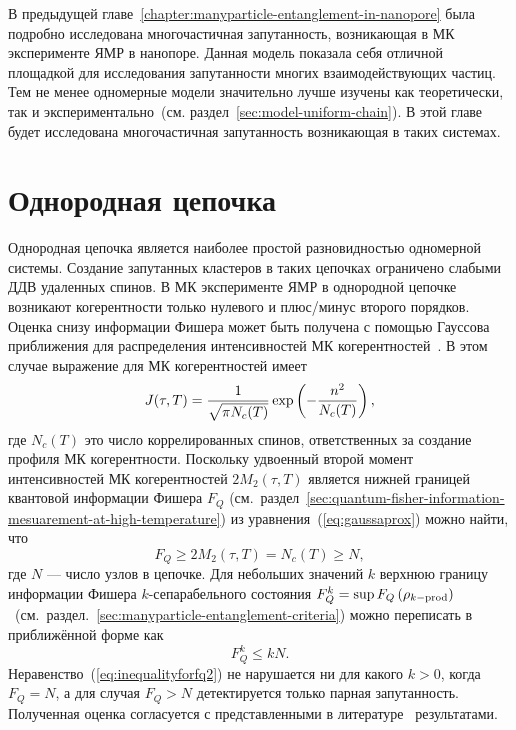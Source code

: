 В предыдущей главе~\ref{chapter:manyparticle-entanglement-in-nanopore}
была подробно исследована многочастичная запутанность,
возникающая в МК эксперименте ЯМР в нанопоре.
Данная модель показала себя отличной площадкой
для исследования запутанности многих взаимодействующих частиц.
Тем не менее одномерные модели значительно лучше изучены как теоретически,
так и экспериментально~(см. раздел~\ref{sec:model-uniform-chain}).
В этой главе будет исследована многочастичная запутанность возникающая в таких системах.


\section{Однородная цепочка}
Однородная цепочка является наиболее простой разновидностью одномерной системы.
Создание запутанных кластеров в таких цепочках ограничено слабыми ДДВ удаленных спинов.
В МК эксперименте ЯМР в однородной цепочке возникают когерентности только нулевого и плюс/минус второго порядков.
Оценка снизу информации Фишера может быть получена с помощью Гауссова приближения для распределения интенсивностей МК когерентностей~\cite{Baum1985}.
В этом случае выражение для МК когерентностей имеет
%
\begin{equation}\label{eq:gaussaprox}
  J(\tau, T)=\dfrac{1}{\sqrt{\pi N_c(T)}} \exp\left( -\frac{n^2}{N_c(T)} \right),
\end{equation}
%
где $N_c(T)$ это число коррелированных спинов,
ответственных за создание профиля МК когерентности.
Поскольку удвоенный второй момент интенсивностей МК когерентностей $2M_2(\tau, T)$ является нижней границей квантовой информации Фишера $F_Q$
(см.~раздел~\ref{sec:quantum-fisher-information-mesuarement-at-high-temperature})
из уравнения~(\ref{eq:gaussaprox}) можно найти, что
%
\begin{equation}\label{eq:qfisheinf}
  F_Q \geq 2M_2(\tau, T) = N_c(T) \geq N,
\end{equation}
%
где $N$ --- число узлов в цепочке.
Для небольших значений $k$ верхнюю границу информации Фишера $k$-сепарабельного состояния
$F^k_Q = \sup{F_Q\left( \rho_{k-\mathrm{prod}} \right)}$~(см.~раздел.~\ref{sec:manyparticle-entanglement-criteria}) можно переписать в приближённой форме как
%
\begin{equation}\label{eq:inequalityforfq2}
  F^k_Q \leq k N.
\end{equation}
%
Неравенство~(\ref{eq:inequalityforfq2}) не нарушается ни для какого $k > 0$, когда $F_Q = N$,
а для случая $F_Q > N$ детектируется только парная запутанность.
Полученная оценка согласуется с представленными в литературе~\cite{Doronin2007, Feldman2012} результатами.

